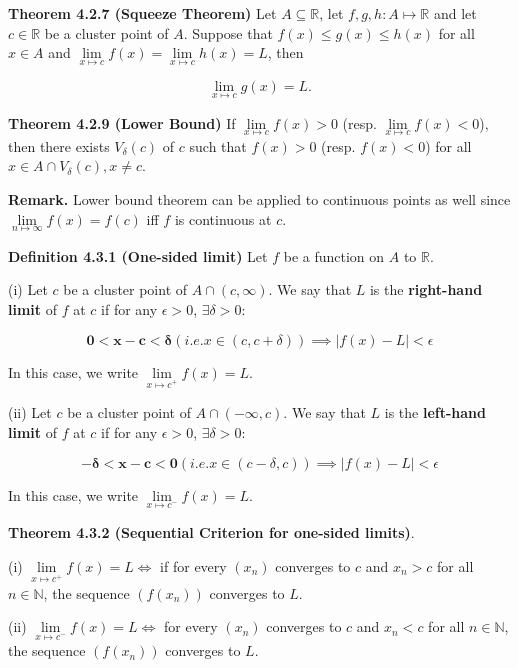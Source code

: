 \documentclass[10pt,landscape]{article}
\begin{document}
\begin{multicols}{4}

\textbf{Theorem 4.2.7 (Squeeze Theorem)} Let $A \subseteq \mathbb{R}$, let $f, g, h : A \mapsto \mathbb{R}$ and let $c \in \mathbb{R}$ be a cluster point of $A$. Suppose that $f(x) \leq g(x) \leq h(x)$ for all $x \in A$ and $\underset{x \mapsto c}{\lim} f(x) = \underset{x \mapsto c}{\lim} h(x) = L$, then 

$$
\underset{x \mapsto c}{\lim} g(x) = L.
$$

\textbf{Theorem 4.2.9 (Lower Bound)} If $\underset{x \mapsto c}{\lim} f(x) > 0$ (resp. $\underset{x \mapsto c}{\lim} f(x) < 0$), then there exists $V_{\delta}(c)$ of $c$ such that  $f(x) > 0$ (resp. $f(x) < 0$) for all $x \in A \cap V_{\delta}(c), x \neq c$.

\textbf{Remark.} Lower bound theorem can be applied to continuous points as well since $\underset{n \mapsto \infty}{\lim} f(x) = f(c)$ iff $f$ is continuous at $c$.

\textbf{Definition 4.3.1 (One-sided limit)} Let $f$ be a function on $A$ to $\mathbb{R}$.

(i) Let $c$ be a cluster point of $A \cap (c, \infty).$ We say that $L$ is the \textbf{right-hand limit} of $f$ at $c$ if for any $\epsilon > 0$, $\exists \delta > 0:$

$$
\mathbf{0 < x - c < \delta} (i.e. x \in (c, c + \delta)) \implies |f(x) - L| < \epsilon
$$

In this case, we write $\underset{x \mapsto c^+}{\lim} f(x) = L$.

(ii) Let $c$ be a cluster point of $A \cap (-\infty, c)$. We say that $L$ is the \textbf{left-hand limit} of $f$ at $c$ if for any $\epsilon > 0$, $\exists \delta > 0:$

$$
\mathbf{-\delta < x - c < 0}  (i.e. x \in (c - \delta, c)) \implies |f(x) - L| < \epsilon
$$

In this case, we write $\underset{x \mapsto c^-}{\lim} f(x) = L$.

\textbf{Theorem 4.3.2 (Sequential Criterion for one-sided limits)}.

(i) $\underset{x \mapsto c^+}{\lim} f(x) = L \iff $ if for every $(x_n)$ converges to $c$ and $x_n > c$ for all $n \in \mathbb{N}$, the sequence $(f(x_n))$ converges to $L$.

(ii) $\underset{x \mapsto c^-}{\lim} f(x) = L \iff$ for every $(x_n)$ converges to $c$ and $x_n < c$ for all $n \in \mathbb{N}$, the sequence $(f(x_n))$ converges to $L$.


\end{multicols}
\end{document}
